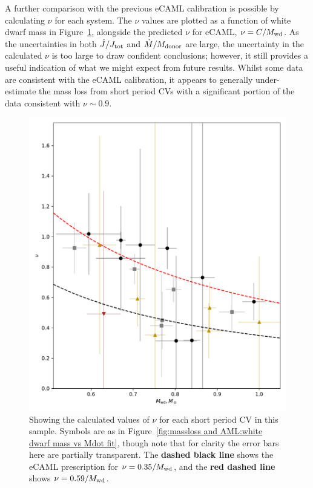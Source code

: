 A further comparison with the previous eCAML calibration is possible by calculating $\nu$ for each system.
The $\nu$ values are plotted as a function of white dwarf mass in Figure~\ref{fig:massloss and AML:calculated nu for all short period CVs}, alongside the predicted $\nu$ for eCAML, $\nu = C / M_{\rm wd}$.
As the uncertainties in both $\dot J/J_{\rm tot}$ and $\dot M / M_{\rm donor}$ are large, the uncertainty in the calculated $\nu$ is too large to draw confident conclusions; however, it still provides a useful indication of what we might expect from future results.
Whilst some data are consistent with the \citet{Schreiber2016} eCAML calibration, it appears to generally under-estimate the mass loss from short period CVs with a significant portion of the data consistent with $\nu \sim 0.9$.
\begin{figure}
    \centering
    \includegraphics[width=\textwidth]{figures/results/Mdot/nu_for_each_system.pdf}
    \caption{Showing the calculated values of $\nu$ for each short period CV in this sample. Symbols are as in Figure~\ref{fig:massloss and AML:white dwarf mass vs Mdot fit}, though note that for clarity the error bars here are partially transparent. The {\bf dashed black line} shows the eCAML prescription for $\nu = 0.35 / M_{\rm wd}$, and the {\bf red dashed line} shows $\nu = 0.59 / M_{\rm wd}$.}
    \label{fig:massloss and AML:calculated nu for all short period CVs}
\end{figure}


